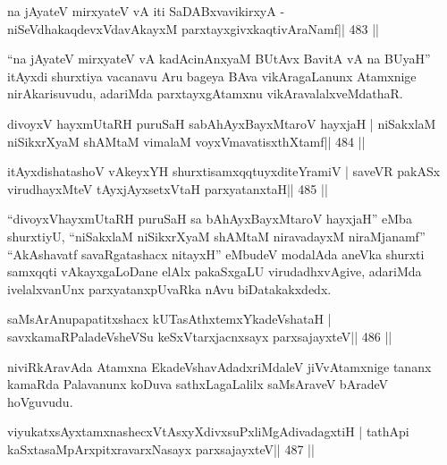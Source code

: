 \begin{shl}
na jAyateV mirxyateV vA iti SaDABxvavikirxyA -
niSeVdhakaqdevxVdavAkayxM parxtayxgivxkaqtivAraNamf\hfill || 483 ||
\end{shl}

\begin{artha}
``na jAyateV mirxyateV vA kadAcinAnxyaM BUtAvx BavitA vA na BUyaH''   itAyxdi shurxtiya vacanavu Aru bageya BAva vikAragaLanunx Atamxnige   nirAkarisuvudu, adariMda  parxtayxgAtamxnu vikAravalalxveMdathaR.
\end{artha}



\begin{shl}
divoyxV hayxmUtaRH puruSaH sabAhAyxBayxMtaroV hayxjaH |
niSakxlaM niSikxrXyaM shAMtaM vimalaM voyxVmavatisxthXtamf\hfill || 484 ||
\end{shl}

\begin{shl}
itAyxdishatashoV vAkeyxYH shurxtisamxqqtuyxditeYramiV |
saveVR pakASx virudhayxMteV tAyxjAyxsetxV\s taH parxyatanxtaH\hfill || 485 ||
\end{shl}

\begin{artha}
``divoyxVhayxmUtaRH puruSaH sa bAhAyxBayxMtaroV hayxjaH'' eMba   shurxtiyU, ``niSakxlaM niSikxrXyaM shAMtaM niravadayxM niraMjanamf''   ``AkAshavatf savaRgatashacx nitayxH'' eMbudeV modalAda aneVka   shurxti samxqqti vAkayxgaLoDane elAlx pakaSxgaLU virudadhxvAgive,   adariMda ivelalxvanUnx parxyatanxpUvaRka nAvu biDatakakxdedx.
\end{artha}



\begin{shl}
saMsArAnupapatitxshacx kUTasAthxtemxYkadeVshataH |
savxkamaRPaladeVsheVSu keSxVtarxjacnxsayx parxsajayxteV\hfill || 486 ||
\end{shl}

\begin{artha}
niviRkAravAda Atamxna EkadeVshavAdadxriMdaleV jiVvAtamxnige tananx kamaRda Palavanunx koDuva sathxLagaLalilx saMsAraveV bAradeV hoVguvudu.
\end{artha}

\begin{shl}
viyukatxsAyx\s\s tamxnashecxVtAsxyXdivxsuPxliMgAdivadagxtiH |
tathA\s pi kaSxtasaMpArxpitxravarxNasayx parxsajayxteV\hfill || 487 ||
\end{shl}

